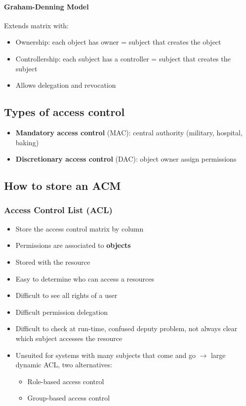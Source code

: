 \documentclass{article}
\newenvironment{myitemize}
{ \begin{itemize}
    \setlength{\itemsep}{005pt}
    \setlength{\parskip}{0pt}
    \setlength{\parsep}{0pt}     }
{ \end{itemize}                  }
\begin{document}
\begin{multicols}{2}
\paragraph{Graham-Denning Model}

Extends matrix with:

\begin{myitemize}
    \item Ownership: each object has owner = subject that creates the object
    \item Controllership: each subject has a controller = subject that creates the subject
    \item Allows delegation and revocation
\end{myitemize}

\subsection{Types of access control}

\begin{myitemize}
    \item \textbf{Mandatory access control} (MAC): central authority (military, hospital, baking)
    \item \textbf{Discretionary access control} (DAC): object owner assign permissions
\end{myitemize}

\subsection{How to store an ACM}

\subsubsection{Access Control List (ACL)}

\begin{myitemize}
    \item Store the access control matrix by column
    \item Permissions are associated to \textbf{objects}
    \item Stored with the resource
    \item Easy to determine who can access a resources
    \item Difficult to see all rights of a user
    \item Difficult permission delegation
    \item Difficult to check at run-time, confused deputy problem, not always clear which subject accesses the resource
    \item Unsuited for systems with many subjects that come and go $\rightarrow$ large dynamic ACL, two alternatives:
    \begin{myitemize}
        \item Role-based access control
        \item Group-based access control
    \end{myitemize}
\end{myitemize}



\end{multicols}
\end{document}
